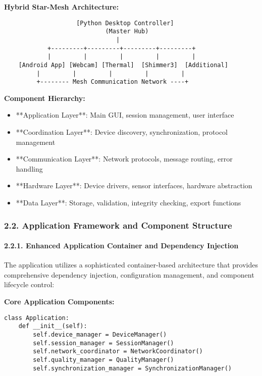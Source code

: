 \documentclass[12pt,a4paper]{article}
\begin{document}
\textbf{Hybrid Star-Mesh Architecture:}

\begin{verbatim}
                    [Python Desktop Controller]
                            (Master Hub)
                               |
            +---------+---------+---------+---------+
            |         |         |         |         |
    [Android App] [Webcam] [Thermal]  [Shimmer3]  [Additional]
         |         |         |         |         |
         +-------- Mesh Communication Network ----+
\end{verbatim}

\textbf{Component Hierarchy:}

\begin{itemize}
\item **Application Layer**: Main GUI, session management, user interface
\item **Coordination Layer**: Device discovery, synchronization, protocol management
\item **Communication Layer**: Network protocols, message routing, error handling
\item **Hardware Layer**: Device drivers, sensor interfaces, hardware abstraction
\item **Data Layer**: Storage, validation, integrity checking, export functions

\end{itemize}
\subsubsection{2.2. Application Framework and Component Structure}

\paragraph{2.2.1. Enhanced Application Container and Dependency Injection}

The application utilizes a sophisticated container-based architecture that provides comprehensive dependency injection,
configuration management, and component lifecycle control:

\textbf{Core Application Components:}

\begin{verbatim}
class Application:
    def __init__(self):
        self.device_manager = DeviceManager()
        self.session_manager = SessionManager()
        self.network_coordinator = NetworkCoordinator()
        self.quality_manager = QualityManager()
        self.synchronization_manager = SynchronizationManager()
\end{verbatim}
\end{document}
